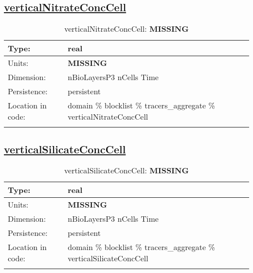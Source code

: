 \subsection[verticalNitrateConcCell]{\hyperref[sec:var_tab_tracers_aggregate]{verticalNitrateConcCell}}
\label{subsec:var_sec_tracers_aggregate_verticalNitrateConcCell}
\begin{center}
\begin{longtable}{| p{2.0in} | p{4.0in} |}
        \hline 
        Type: & real \\
        \hline 
        Units: & {\bf \color{red} MISSING} \\
        \hline 
        Dimension: & nBioLayersP3 nCells Time \\
        \hline 
        Persistence: & persistent \\
        \hline 
         Location in code: & domain \% blocklist \% tracers\_aggregate \% verticalNitrateConcCell \\
         \hline 
    \caption{verticalNitrateConcCell: {\bf \color{red} MISSING}}
\end{longtable}
\end{center}
\subsection[verticalSilicateConcCell]{\hyperref[sec:var_tab_tracers_aggregate]{verticalSilicateConcCell}}
\label{subsec:var_sec_tracers_aggregate_verticalSilicateConcCell}
\begin{center}
\begin{longtable}{| p{2.0in} | p{4.0in} |}
        \hline 
        Type: & real \\
        \hline 
        Units: & {\bf \color{red} MISSING} \\
        \hline 
        Dimension: & nBioLayersP3 nCells Time \\
        \hline 
        Persistence: & persistent \\
        \hline 
         Location in code: & domain \% blocklist \% tracers\_aggregate \% verticalSilicateConcCell \\
         \hline 
    \caption{verticalSilicateConcCell: {\bf \color{red} MISSING}}
\end{longtable}
\end{center}
